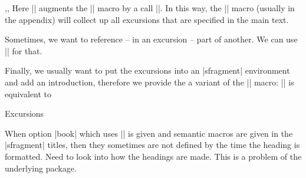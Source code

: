 \begin{function}{\activateexcursion,\printexcursion,\excursionref}
  Here || augments the |\printexcursions| macro by a call
  ||. In this way, the |\printexcursions| macro (usually in the
  appendix) will collect up all excursions that are specified in the main text.

  Sometimes, we want to reference -- in an excursion -- part of another. We can use
  || for that.
\end{function}

\begin{function}{\excursiongroup}
  Finally, we usually want to put the excursions into an |sfragment| environment and add
  an introduction, therefore we provide the a variant of the |\printexcursions| macro:
  |\excursiongroup[id=|\meta{id}|,intro=|\meta{path}|]| is equivalent to
\begin{latexcode}
\begin{note}
\begin{sfragment}[id=<id>]{Excursions}
  \printexcursions
\end{sfragment}
\end{note}
\end{latexcode}
\end{function}

\begin{dangerbox}
  When option |book| which uses |\pagestyle{headings}| is given and semantic macros are
  given in the |sfragment| titles, then they sometimes are not defined by the time the
  heading is formatted. Need to look into how the headings are made. This is a problem of
  the underlying  package.
\end{dangerbox}

